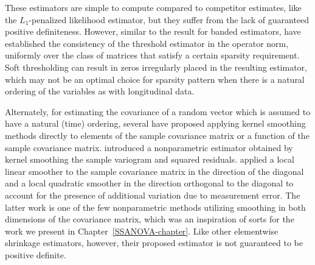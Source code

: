 These estimators are simple to compute compared to competitor estimates, like the $L_1$-penalized likelihood estimator, but they suffer from the lack of guaranteed positive definiteness. However, similar to the result for banded estimators, \cite{bickel2008covariance} have established the consistency of the threshold estimator in the operator norm, uniformly over the class of matrices that satisfy a certain sparsity requirement. Soft thresholding can result in zeros irregularly placed in the resulting estimator, which may not be an optimal choice for sparsity pattern when there is a natural ordering of the variables as with longitudinal data.

\bigskip

Alternately, for estimating the covariance of a random vector which is assumed to have a natural (time) ordering, several have proposed applying kernel smoothing methods directly to elements of the sample covariance matrix or a function of the sample covariance matrix. \cite{zeger1994semiparametric} introduced a nonparametric estimator obtained by kernel smoothing the sample variogram and squared residuals.  \cite{yao2005functional} applied a local linear smoother to the sample covariance matrix in the direction of the diagonal and a local quadratic smoother in the direction orthogonal to the diagonal to account for the presence of additional variation due to measurement error. The latter work is one of the few nonparametric methods utilizing smoothing in both dimensions of the covariance matrix, which was an inspiration of sorts for the work we present in Chapter~\ref{SSANOVA-chapter}. Like other elementwise shrinkage estimators, however, their proposed estimator is not guaranteed to be positive definite. 

\bigskip

